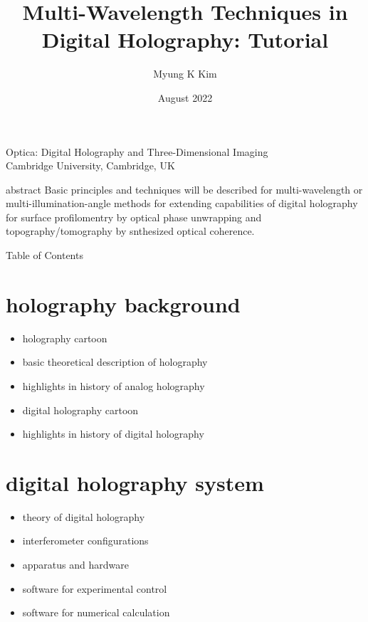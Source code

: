 \documentclass[t, aspectratio=169]{beamer}
\title{Multi-Wavelength Techniques in Digital Holography: Tutorial}
\author{Myung K Kim}
\institute{Dept of Physics, University of South Florida, Tampa, FL USA 33620}
\date{August 2022}
\begin{document}
\begin{frame}
	Optica: Digital Holography and Three-Dimensional Imaging\\
	Cambridge University, Cambridge, UK
	\titlepage
\end{frame}


\begin{frame}{abstract}
Basic principles and techniques will be described for multi-wavelength or multi-illumination-angle methods for extending capabilities of digital holography for surface profilomentry by optical phase unwrapping and topography/tomography by snthesized optical coherence.
\end{frame}


\begin{frame}[allowframebreaks]{Table of Contents}
	\tableofcontents[hideallsubsections]
\end{frame}


\section{holography background}

\begin{frame}{\secname}
	\begin{itemize}
		\item holography cartoon
		\item basic theoretical description of holography
		\item highlights in history of analog holography 
		\item digital holography cartoon
		\item highlights in history of digital holography
	\end{itemize}
\end{frame}


\section{digital holography system}

\begin{frame}{\secname}
	\begin{itemize}
		\item theory of digital holography
		\item interferometer configurations
		\item apparatus and hardware
		\item software for experimental control
		\item software for numerical calculation
	\end{itemize}
\end{frame}
\end{document}
